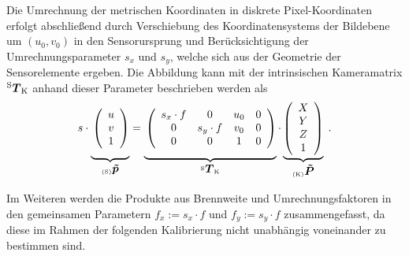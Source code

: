 Die Umrechnung der metrischen Koordinaten in diskrete Pixel-Koordinaten erfolgt abschließend durch Verschiebung des Koordinatensystems der Bildebene um $(u_0,v_0)$ in den Sensorursprung und Berücksichtigung der Umrechnungsparameter $s_x$ und $s_y$, welche sich aus der Geometrie der Sensorelemente ergeben. Die Abbildung kann mit der intrinsischen Kameramatrix ${^{\mathrm{S}}\mbox{\boldmath{$T$}}_{\mathrm{K}}}$ anhand dieser Parameter beschrieben werden als
%
%
%
\begin{equation}
s \cdot
\underbrace{ 
\vphantom{\mat{c}{
X\\
Y\\
Z\\
1
}}
\mat{c}{
u\\
v\\
1
}
}_{\ve{S}{\tilde{p}}}
= 
\underbrace{ 
\vphantom{\mat{c}{
X\\
Y\\
Z\\
1
}}
\mat{cccc}{
s_x \cdot f & 0 & u_\ind{0} & 0\\
0 & s_y \cdot f & v_\ind{0} & 0\\
0 & 0 & 1 & 0
}
}_\tmat{S}{K}
 \cdot
\underbrace{
\mat{c}{
X\\
Y\\
Z\\
1
}
}_{\ve{K}{\tilde{P}}}
 \; \text{.}
\label{eq.intrinsic}
\end{equation}%

Im Weiteren werden die Produkte aus Brennweite und Umrechnungsfaktoren in den gemeinsamen Parametern $f_x := s_x \cdot f$ und $f_y := s_y \cdot f$ zusammengefasst, da diese im Rahmen der folgenden Kalibrierung nicht unabhängig voneinander zu bestimmen sind.

